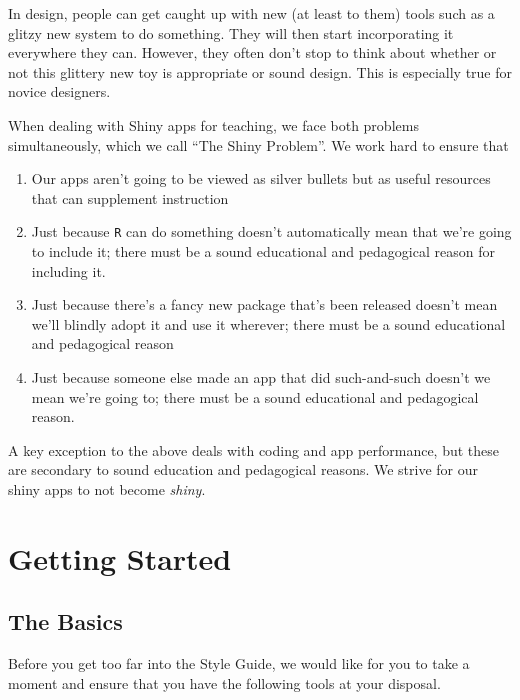 \documentclass[
]{book}
\providecommand{\tightlist}{%
  \setlength{\itemsep}{0pt}\setlength{\parskip}{0pt}}
\begin{document}
In design, people can get caught up with new (at least to them) tools such as a glitzy new system to do something. They will then start incorporating it everywhere they can. However, they often don't stop to think about whether or not this glittery new toy is appropriate or sound design. This is especially true for novice designers.

When dealing with Shiny apps for teaching, we face both problems simultaneously, which we call ``The Shiny Problem''. We work hard to ensure that

\begin{enumerate}
\def\labelenumi{\arabic{enumi}.}
\tightlist
\item
  Our apps aren't going to be viewed as silver bullets but as useful resources that can supplement instruction
\item
  Just because \texttt{R} can do something doesn't automatically mean that we're going to include it; there must be a sound educational and pedagogical reason for including it.
\item
  Just because there's a fancy new package that's been released doesn't mean we'll blindly adopt it and use it wherever; there must be a sound educational and pedagogical reason
\item
  Just because someone else made an app that did such-and-such doesn't we mean we're going to; there must be a sound educational and pedagogical reason.
\end{enumerate}

A key exception to the above deals with coding and app performance, but these are secondary to sound education and pedagogical reasons. We strive for our shiny apps to not become \emph{shiny}.

\hypertarget{part-getting-started}{%
\part{Getting Started}\label{part-getting-started}}

\setcounter{chapter}{0}

\hypertarget{basics}{%
\chapter{The Basics}\label{basics}}

Before you get too far into the Style Guide, we would like for you to take a moment and ensure that you have the following tools at your disposal.
\end{document}
